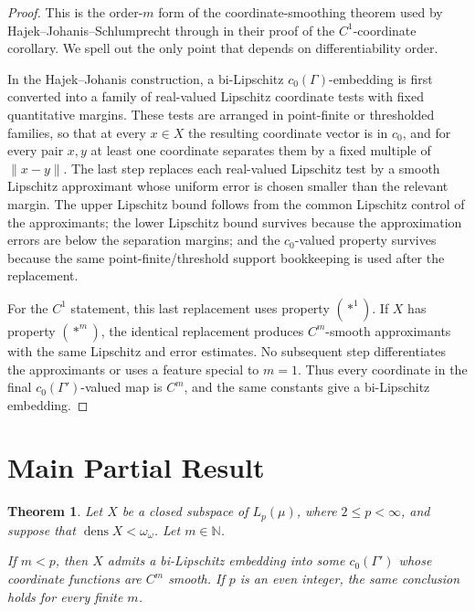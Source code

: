 \documentclass[11pt]{article}
\newtheorem{theorem}{Theorem}
\newcommand{\dens}{\operatorname{dens}}
\begin{document}
\begin{proof}
This is the order-\(m\) form of the coordinate-smoothing theorem used by
Hajek--Johanis--Schlumprecht through \cite[Theorem 7.63]{HJBook} in their
proof of the \(C^1\)-coordinate corollary.  We spell out the only point that
depends on differentiability order.

In the Hajek--Johanis construction, a bi-Lipschitz \(c_0(\Gamma)\)-embedding
is first converted into a family of real-valued Lipschitz coordinate tests
with fixed quantitative margins.  These tests are arranged in point-finite
or thresholded families, so that at every \(x\in X\) the resulting coordinate
vector is in \(c_0\), and for every pair \(x,y\) at least one coordinate
separates them by a fixed multiple of \(\|x-y\|\).  The last step replaces
each real-valued Lipschitz test by a smooth Lipschitz approximant whose
uniform error is chosen smaller than the relevant margin.  The upper
Lipschitz bound follows from the common Lipschitz control of the approximants;
the lower Lipschitz bound survives because the approximation errors are below
the separation margins; and the \(c_0\)-valued property survives because the
same point-finite/threshold support bookkeeping is used after the replacement.

For the \(C^1\) statement, this last replacement uses property \((\ast^1)\).
If \(X\) has property \((\ast^m)\), the identical replacement produces
\(C^m\)-smooth approximants with the same Lipschitz and error estimates.
No subsequent step differentiates the approximants or uses a feature special
to \(m=1\).  Thus every coordinate in the final \(c_0(\Gamma')\)-valued map is
\(C^m\), and the same constants give a bi-Lipschitz embedding.
\end{proof}

\section*{Main Partial Result}

\begin{theorem}
\label{thm:lp}
Let \(X\) be a closed subspace of \(L_p(\mu)\), where \(2\leq p<\infty\), and
suppose that \(\dens X<\omega_\omega\).  Let \(m\in\mathbb N\).

If \(m<p\), then \(X\) admits a bi-Lipschitz embedding into some
\(c_0(\Gamma')\) whose coordinate functions are \(C^m\) smooth.  If \(p\) is
an even integer, the same conclusion holds for every finite \(m\).
\end{theorem}
\end{document}

